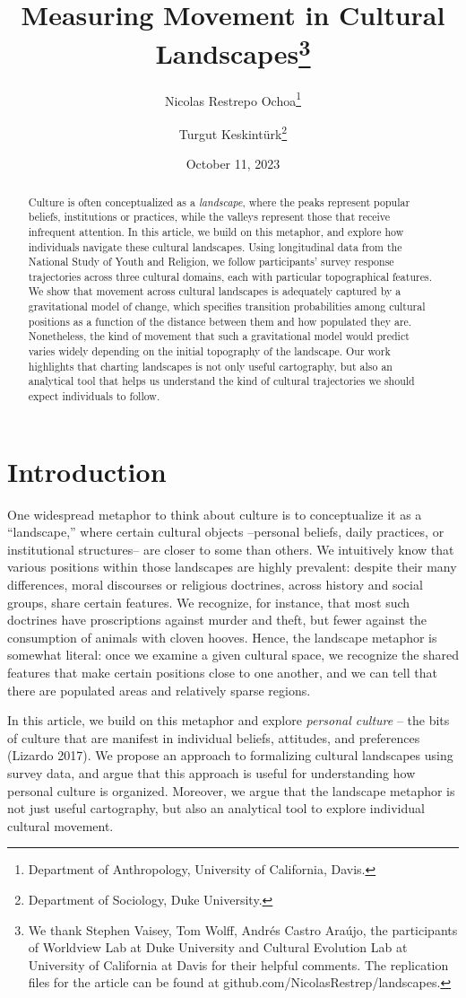 \documentclass[
  11pt,
]{article}
\title{Measuring Movement in Cultural Landscapes\footnote{We thank
  Stephen Vaisey, Tom Wolff, Andrés Castro Araújo, the participants of
  Worldview Lab at Duke University and Cultural Evolution Lab at
  University of California at Davis for their helpful comments. The
  replication files for the article can be found at
  github.com/NicolasRestrep/landscapes.}}
\author{Nicolas Restrepo Ochoa\footnote{Department of Anthropology,
  University of California, Davis.} \and Turgut Keskintürk\footnote{Department
  of Sociology, Duke University.}}
\date{October 11, 2023}
\begin{document}
\maketitle
\begin{abstract}
Culture is often conceptualized as a \emph{landscape}, where the peaks
represent popular beliefs, institutions or practices, while the valleys
represent those that receive infrequent attention. In this article, we
build on this metaphor, and explore how individuals navigate these
cultural landscapes. Using longitudinal data from the National Study of
Youth and Religion, we follow participants' survey response trajectories
across three cultural domains, each with particular topographical
features. We show that movement across cultural landscapes is adequately
captured by a gravitational model of change, which specifies transition
probabilities among cultural positions as a function of the distance
between them and how populated they are. Nonetheless, the kind of
movement that such a gravitational model would predict varies widely
depending on the initial topography of the landscape. Our work
highlights that charting landscapes is not only useful cartography, but
also an analytical tool that helps us understand the kind of cultural
trajectories we should expect individuals to follow.
\end{abstract}

\hypertarget{introduction}{%
\section{Introduction}\label{introduction}}

One widespread metaphor to think about culture is to conceptualize it as
a ``landscape,'' where certain cultural objects --personal beliefs,
daily practices, or institutional structures-- are closer to some than
others. We intuitively know that various positions within those
landscapes are highly prevalent: despite their many differences, moral
discourses or religious doctrines, across history and social groups,
share certain features. We recognize, for instance, that most such
doctrines have proscriptions against murder and theft, but fewer against
the consumption of animals with cloven hooves. Hence, the landscape
metaphor is somewhat literal: once we examine a given cultural space, we
recognize the shared features that make certain positions close to one
another, and we can tell that there are populated areas and relatively
sparse regions.

In this article, we build on this metaphor and explore \emph{personal
culture} -- the bits of culture that are manifest in individual beliefs,
attitudes, and preferences (Lizardo 2017). We propose an approach to
formalizing cultural landscapes using survey data, and argue that this
approach is useful for understanding how personal culture is organized.
Moreover, we argue that the landscape metaphor is not just useful
cartography, but also an analytical tool to explore individual cultural
movement.
\end{document}
